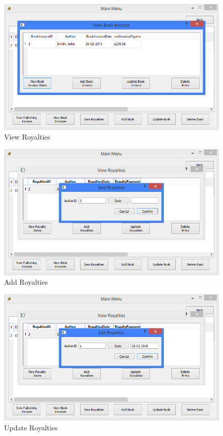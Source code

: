 \begin{figure}[H]
    \caption{View Royalties} \label{fig:ViewRoyalties}
    \includegraphics[width=\textwidth]{./Maintenance/UserInterface/ViewBookInvoices.png}
\end{figure}

\begin{figure}[H]
    \caption{Add Royalties} \label{fig:AddRoyalties}
    \includegraphics[width=\textwidth]{./Maintenance/UserInterface/AddRoyalties.png}
\end{figure}

\begin{figure}[H]
    \caption{Update Royalties} \label{fig:UpdateRoyalties}
    \includegraphics[width=\textwidth]{./Maintenance/UserInterface/UpdateRoyalties.png}
\end{figure}

